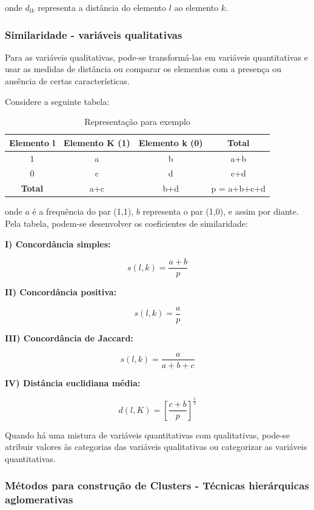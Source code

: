 \documentclass[
]{estat/estat}
\begin{document}
onde \(d_{lk}\) representa a distância do elemento \(l\) ao elemento
\(k\).

\subsubsection{Similaridade - variáveis
qualitativas}\label{similaridade---variuxe1veis-qualitativas}

Para as variáveis qualitativas, pode-se transformá-las em variáveis
quantitativas e usar as medidas de distância ou comparar os elementos
com a presença ou ausência de certas características.

Considere a seguinte tabela:

\begin{table}[H]
\centering
\caption{Representação para exemplo}
\begin{tabular}{c | c c c}
\toprule
\textbf{Elemento l} & \textbf{Elemento K (1)} & \textbf{Elemento k (0)} & \textbf{Total} \\
\midrule
1      & a & b & a+b \\
0       & c & d & c+d \\
\midrule
\textbf{Total} & a+c & b+d & p = a+b+c+d \\ 
\bottomrule
\end{tabular}
\end{table}

onde \(a\) é a frequência do par (1,1), \(b\) representa o par (1,0), e
assim por diante. Pela tabela, podem-se desenvolver os coeficientes de
similaridade:

\textbf{I) Concordância simples:}

\[
s(l,k) = \frac{a+b}{p}
\]

\textbf{II) Concordância positiva:}

\[
s(l,k) = \frac{a}{p}
\]

\textbf{III) Concordância de Jaccard:}

\[
s(l,k) = \frac{a}{a+b+c}
\]

\textbf{IV) Distância euclidiana média:}

\[
d(l,K) = \left[ \frac{c+b}{p} \right]^{\frac{1}{2}}
\]

Quando há uma mistura de variáveis quantitativas com qualitativas,
pode-se atribuir valores às categorias das variáveis qualitativas ou
categorizar as variáveis quantitativas.

\subsubsection{Métodos para construção de Clusters - Técnicas
hierárquicas
aglomerativas}\label{muxe9todos-para-construuxe7uxe3o-de-clusters---tuxe9cnicas-hieruxe1rquicas-aglomerativas}
\end{document}

